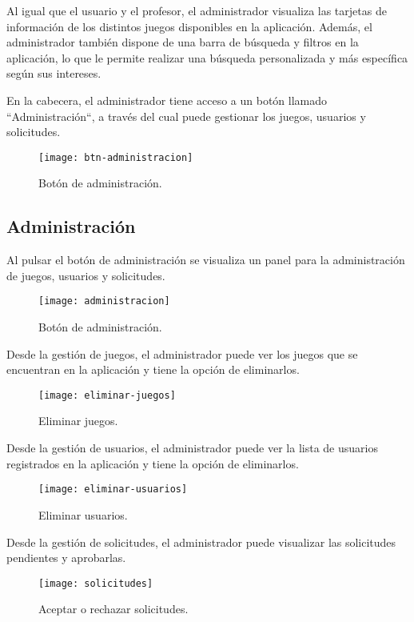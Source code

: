 Al igual que el usuario y el profesor, el administrador visualiza las tarjetas de información de los distintos juegos disponibles en la aplicación. Además, el administrador también dispone de una barra de búsqueda y filtros en la aplicación, lo que le permite realizar una búsqueda personalizada y más específica según sus intereses.

En la cabecera, el administrador tiene acceso a un botón llamado ``Administración``, a través del cual puede gestionar los juegos, usuarios y solicitudes.

\begin{figure}[htb]
\centering
\texttt{[image: btn-administracion]}
\caption{Botón de administración.}
\label{fig:btn-administracion}
\end{figure}

\subsection{Administración}
Al pulsar el botón de administración se visualiza un panel para la administración de juegos, usuarios y solicitudes.
\begin{figure}[htb]
\centering
\texttt{[image: administracion]}
\caption{Botón de administración.}
\label{fig:administracion}
\end{figure}

Desde la gestión de juegos, el administrador puede ver los juegos que se encuentran en la aplicación y tiene la opción de eliminarlos.
\begin{figure}[htb]
\centering
\texttt{[image: eliminar-juegos]}
\caption{Eliminar juegos.}
\label{fig:eliminar-juegos}
\end{figure}
\newpage
Desde la gestión de usuarios, el administrador puede ver la lista de usuarios registrados en la aplicación y tiene la opción de eliminarlos.

\begin{figure}[htb]
\centering
\texttt{[image: eliminar-usuarios]}
\caption{Eliminar usuarios.}
\label{fig:eliminar-usuarios}
\end{figure}

Desde la gestión de solicitudes, el administrador puede visualizar las solicitudes pendientes y aprobarlas.
\begin{figure}[htb]
\centering
\texttt{[image: solicitudes]}
\caption{Aceptar o rechazar solicitudes.}
\label{fig:solicitudes}
\end{figure}